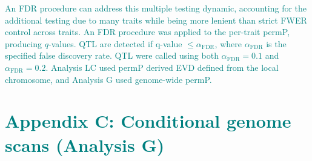 \documentclass[9pt,twocolumn,twoside]{gsajnl}
\newcommand{\GKinline}[1]{\textcolor{teal}{#1}}
\begin{document}
\GKinline{An FDR procedure can address this multiple testing dynamic, accounting for the additional testing due to many traits while being more lenient than strict FWER control across traits. An FDR procedure \citep{Benjamini1995,Storey2003} was applied to the per-trait permP, producing $q$-values. QTL are detected if q-value $\le \alpha_{\text{FDR}}$, where $\alpha_{\text{FDR}}$ is the specified false discovery rate. QTL were called using both $\alpha_{\text{FDR}} = 0.1$ and $\alpha_{\text{FDR}} = 0.2$. Analysis LC used permP derived EVD defined from the local chromosome, and Analysis G used genome-wide permP.}


\section{\GKinline{Appendix C: Conditional genome scans (Analysis G)}}
\end{document}
